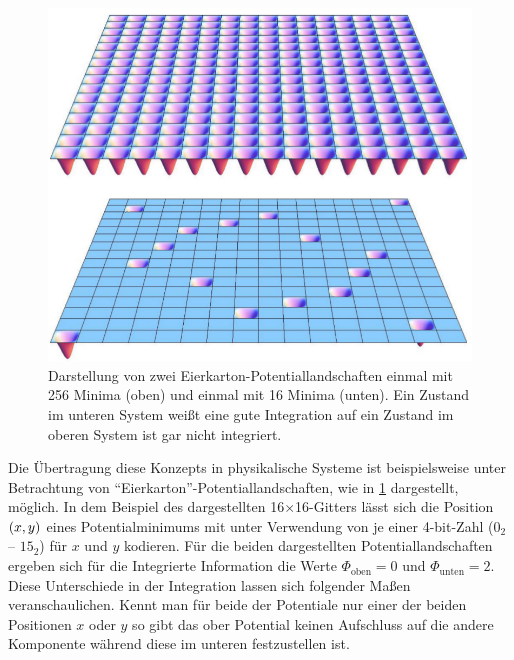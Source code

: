 \FloatBarrier
\begin{figure}
	\centering
	\includegraphics[scale=0.23]{graphics/egg_crate_potentials.jpg}
	\caption{Darstellung von zwei Eierkarton-Potentiallandschaften einmal mit 256 Minima (oben) und einmal 
		mit 16 Minima (unten). Ein Zustand im unteren System weißt eine gute Integration auf ein Zustand im oberen System ist gar nicht integriert.\label{fig:eggcrate_potential}}
\end{figure}  


Die Übertragung diese Konzepts in physikalische Systeme ist beispielsweise unter Betrachtung von 
\enquote{Eierkarton}-Potentiallandschaften, wie in \cref{fig:eggcrate_potential} dargestellt, möglich.
In dem Beispiel des dargestellten 16$\times$16-Gitters lässt sich die Position $\del{x,y}$ eines Potentialminimums
mit unter Verwendung von je einer 4-bit-Zahl ($0_2$ -- $15_2$) für $x$ und $y$ kodieren. Für die beiden dargestellten 
Potentiallandschaften ergeben sich für die Integrierte Information die Werte $\Phi_{\mathrm{oben}} = 0$  und 
$\Phi_{\mathrm{unten}} = 2$. Diese Unterschiede in der Integration lassen sich folgender Maßen veranschaulichen.
Kennt man für beide der Potentiale nur einer der beiden Positionen $x$ oder $y$ so gibt das ober Potential keinen
Aufschluss auf die andere Komponente während diese im unteren festzustellen ist.

